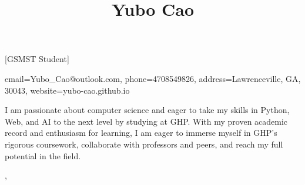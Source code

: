 \documentclass[inter=true, sidebar-width=2.25in, primary=slate]{clean-resume}
\begin{document}
  \begin{sidebar}
    
    \title{Yubo Cao}[GSMST Student]
    
    
    \contact
    {
      email={Yubo\_Cao@outlook.com},
      phone=4708549826,
      address={Lawrenceville, GA, 30043},
      website={yubo-cao.github.io}
    }
    
    
    I am passionate about computer science and eager to take my skills in Python,   Web, and AI to the next level by studying at GHP. With my proven academic   record and enthusiasm for learning, I am eager to immerse myself in GHP's   rigorous coursework, collaborate with professors and peers, and reach my full   potential in the field.
  \end{sidebar}%
  \sep%
\end{document}

